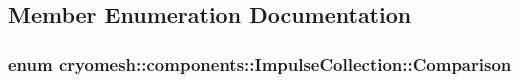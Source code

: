 \subsection{\-Member \-Enumeration \-Documentation}
\hypertarget{classcryomesh_1_1components_1_1ImpulseCollection_a3682719f1c0bd471e8c5a19b39cc285d}{
\subsubsection[{\-Comparison}]{\setlength{\rightskip}{0pt plus 5cm}enum {\bf cryomesh\-::components\-::\-Impulse\-Collection\-::\-Comparison}}}\label{classcryomesh_1_1components_1_1ImpulseCollection_a3682719f1c0bd471e8c5a19b39cc285d}
